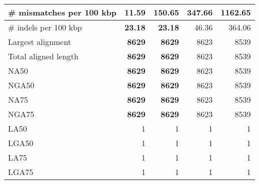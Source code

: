 \documentclass[12pt,a4paper]{article}
\begin{document}
\begin{table}[ht]
\begin{center}
\begin{tabular}{|l*{4}{|r}|}
\# mismatches per 100 kbp & {\bf 11.59} & 150.65 & 347.66 & 1162.65 \\ \hline
\# indels per 100 kbp & {\bf 23.18} & {\bf 23.18} & 46.36 & 364.06 \\ \hline
Largest alignment & {\bf 8629} & {\bf 8629} & 8623 & 8539 \\ \hline
Total aligned length & {\bf 8629} & {\bf 8629} & 8623 & 8539 \\ \hline
NA50 & {\bf 8629} & {\bf 8629} & 8623 & 8539 \\ \hline
NGA50 & {\bf 8629} & {\bf 8629} & 8623 & 8539 \\ \hline
NA75 & {\bf 8629} & {\bf 8629} & 8623 & 8539 \\ \hline
NGA75 & {\bf 8629} & {\bf 8629} & 8623 & 8539 \\ \hline
LA50 & 1 & 1 & 1 & 1 \\ \hline
LGA50 & 1 & 1 & 1 & 1 \\ \hline
LA75 & 1 & 1 & 1 & 1 \\ \hline
LGA75 & 1 & 1 & 1 & 1 \\ \hline
\end{tabular}
\end{center}
\end{table}
\end{document}
